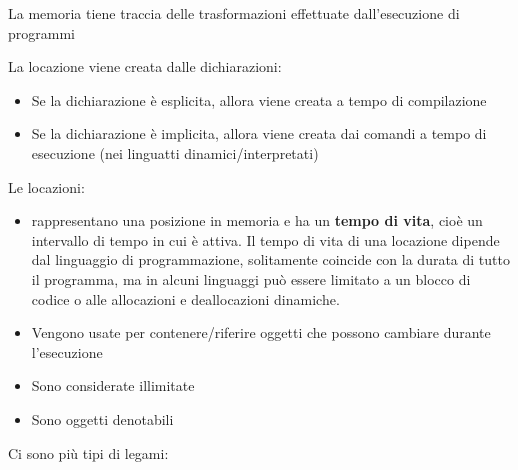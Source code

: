 \documentclass[a4paper]{article}
\begin{document}
\begin{definition}[Memoria]
  La memoria tiene traccia delle trasformazioni effettuate dall'esecuzione di
  programmi
\end{definition}

\begin{definition}[Locazione]
  La locazione viene creata dalle dichiarazioni:
  \begin{itemize}
    \item Se la dichiarazione è esplicita, allora viene creata a tempo di compilazione
    \item Se la dichiarazione è implicita, allora viene creata dai comandi a tempo di
      esecuzione (nei linguatti dinamici/interpretati)
  \end{itemize}
  Le locazioni:
  \begin{itemize}
    \item rappresentano una posizione in memoria e ha un \textbf{tempo di vita},
      cioè un intervallo di tempo in cui è attiva. Il tempo di vita di una locazione
      dipende dal linguaggio di programmazione, solitamente coincide con la durata di tutto
      il programma, ma in alcuni linguaggi può essere limitato a un blocco di codice o
      alle allocazioni e deallocazioni dinamiche.

    \item Vengono usate per contenere/riferire oggetti che possono cambiare durante
      l'esecuzione

    \item Sono considerate illimitate

    \item Sono oggetti denotabili
  \end{itemize}
\end{definition}
Ci sono più tipi di legami:
\end{document}
